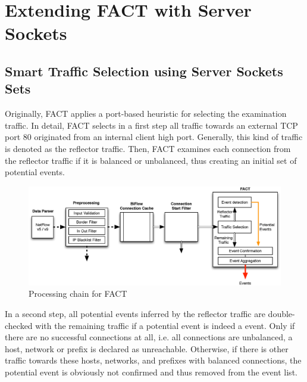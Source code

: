 
\chapter{Extending FACT with Server Sockets\label{chapter:integration}}

\section{Smart Traffic Selection using Server Sockets Sets\label{section:ses_traffic_selection}}
Originally, \gls{FACT} applies a port-based heuristic for selecting the 
examination traffic. 
In detail, \gls{FACT} selects in a first step all traffic towards an external 
\gls{TCP} port 80 originated from an internal client high port. 
Generally, this kind of traffic is denoted as the reflector traffic. 
Then, \gls{FACT} examines each connection from the reflector traffic if it is 
balanced or unbalanced, thus creating an initial set of potential events. 

\begin{figure}
	[!b] \centering
	\includegraphics[width=\linewidth]{images/FACT.eps}
	\caption{Processing chain for FACT} 
	\label{fig:fact_chain} 
\end{figure}

In a second step, all potential events inferred by the reflector traffic are 
double-checked with the remaining traffic if a potential event is indeed a 
event. Only if there are no successful connections at all, i.e. all connections 
are unbalanced, a host, network or prefix is declared as unreachable. Otherwise, 
if there is other traffic towards these hosts, networks, and prefixes with 
balanced connections, the potential event is obviously not confirmed and thus 
removed from the event list. 

